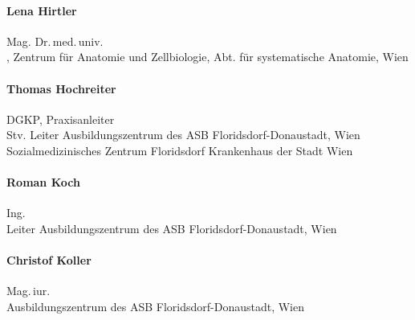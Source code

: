 \begin{raggedright}
  \bigskip

  \begin{minipage}{\linewidth}\raggedright
    \paragraph{Lena Hirtler}
    Mag. Dr.\,med.\,univ.
    \\[.25\baselineskip]
    ,
    Zentrum für Anatomie und Zellbiologie, 
    Abt. für systematische Anatomie, 
    Wien
  \end{minipage}

  \bigskip

  \begin{minipage}{\linewidth}\raggedright
    \paragraph{Thomas Hochreiter}
    DGKP, Praxisanleiter
    \\[.25\baselineskip]
    \noindent{}Stv. Leiter Ausbildungszentrum des {\color{AltBlueDark}ASB Florids\-dorf-Donau\-stadt}, Wien\\[.25\baselineskip]
    {\color{AltBlueDark}Sozialmedizinisches Zentrum Floridsdorf Krankenhaus der Stadt Wien}
  \end{minipage}

  \bigskip

  \begin{minipage}{\linewidth}\raggedright
    \paragraph{Roman Koch}
    Ing.
    \\[.25\baselineskip]
    \noindent{}Leiter Ausbildungszentrum des {\color{AltBlueDark}ASB
    Florids\-dorf-Donau\-stadt}, Wien
  \end{minipage}

  \bigskip

  \begin{minipage}{\linewidth}\raggedright
    \paragraph{Christof Koller}
    Mag.\,iur.
    \\[.25\baselineskip]
    \noindent{}Ausbildungszentrum des {\color{AltBlueDark}ASB
    Florids\-dorf-Donau\-stadt}, Wien
  \end{minipage}


\end{raggedright}
